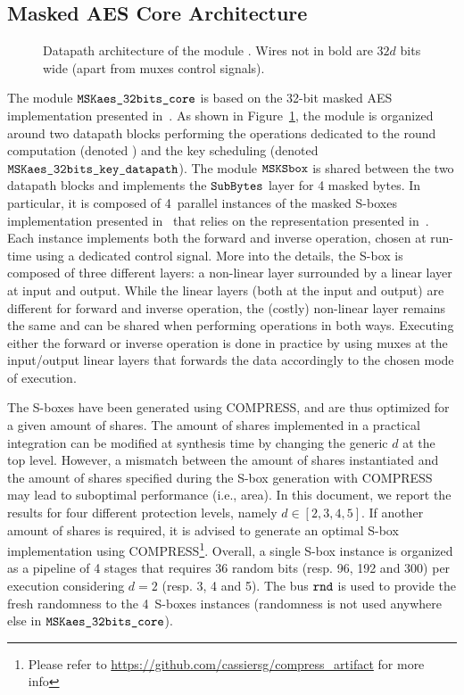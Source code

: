 \documentclass{scrartcl}
\begin{document}
\subsection{Masked AES Core Architecture} 
\label{section:masked_aes_core_arhcitecture}

\begin{figure}
    \centering
    \resizebox{\textwidth}{!}{
        \begin{tikzpicture}
            
        \end{tikzpicture}
    }
    \caption{Datapath architecture of the module \topModAES. Wires not in bold are $32d$ bits wide (apart from muxes control signals).}
    \label{fig:aes_glob_arch}
\end{figure}

The module $\texttt{MSKaes\_32bits\_core}$ is based on the 32-bit masked AES implementation
presented in~\cite{DBLP:conf/cosade/MominCS22}. As shown in
Figure~\ref{fig:aes_glob_arch}, the module is organized around two datapath
blocks performing the operations dedicated to the round computation (denoted
\modAESdpState) and the key scheduling (denoted $\texttt{MSKaes\_32bits\_key\_datapath}$). The module
$\texttt{MSKSbox}$ is shared between the two datapath blocks and implements the
$\texttt{SubBytes}$ layer for 4 masked bytes. In particular, it is composed of 4~parallel
instances of the masked S-boxes implementation presented
in~\cite{DBLP:journals/tches/CassiersGMMN24} that relies on the representation
presented in~\cite{DBLP:conf/ches/Canright05}.  Each instance implements both
the forward and inverse operation, chosen at run-time using a dedicated control
signal. More into the details, the S-box is composed of three different layers:
a non-linear layer surrounded by a linear layer at input and output. While the
linear layers (both at the input and output) are different for forward and
inverse operation, the (costly) non-linear layer remains the same and can be
shared when performing operations in both ways.  Executing either the forward
or inverse operation is done in practice by using muxes at the input/output
linear layers that forwards the data accordingly to the chosen mode of execution. 

The S-boxes have been generated using COMPRESS, and are thus optimized for a
given amount of shares. The amount of shares implemented in a practical
integration can be modified at synthesis time by changing the generic $d$ at
the top level. However, a mismatch between the amount of shares instantiated
and the amount of shares specified during the S-box generation with COMPRESS
may lead to suboptimal performance (i.e., area). In this
document, we report the results for four different protection levels, namely
$d\in[2,3,4,5]$. If another amount of shares is required, it is advised to
generate an optimal S-box implementation using COMPRESS\footnote{Please refer
    to
    \href{https://github.com/cassiersg/compress_artifact}{https://github.com/cassiersg/compress\_artifact}
for more info}.  Overall, a single S-box instance is organized as a pipeline of 4 stages that
requires 36 random bits (resp. 96, 192 and 300) per execution considering $d=2$
(resp. 3, 4 and 5). The bus $\texttt{rnd}$ is used to provide the fresh
randomness to the 4~S-boxes instances (randomness is not used anywhere else in
$\texttt{MSKaes\_32bits\_core}$). 
\end{document}
